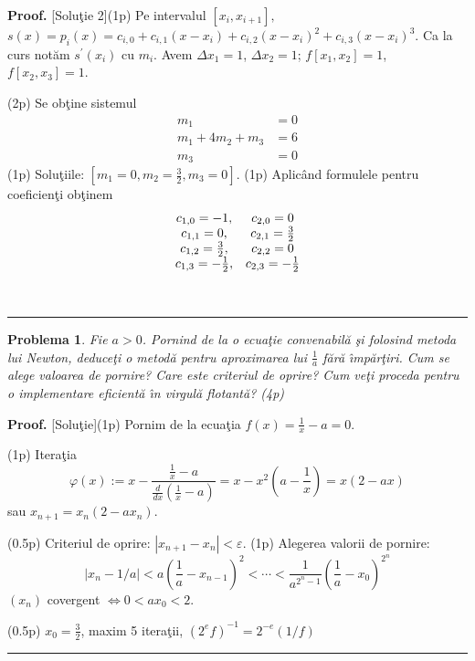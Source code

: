 \documentclass{article}%
\newtheorem{problem}[theorem]{Problema}
\newenvironment{proof}[1][Proof]{\noindent\textbf{#1.} }{\ \rule{0.5em}{0.5em}}
\begin{document}
\begin{proof}
[Solu\c{t}ie 2](1p) Pe intervalul $[x_{i},x_{i+1}],$ $s(x)=p_{i}%
(x)=c_{i,0}+c_{i,1}(x-x_{i})+c_{i,2}(x-x_{i})^{2}+c_{i,3}(x-x_{i})^{3}$. Ca la
curs not\u{a}m $s^{\prime}(x_{i})$ cu $m_{i}$. Avem $\Delta x_{1}=1$, $\Delta
x_{2}=1$; $f[x_{1},x_{2}]=1$, $f[x_{2},x_{3}]=1$. 

(2p) Se ob\c{t}ine sistemul%
\begin{align*}
m_{1}  &  =0\\
m_{1}+4m_{2}+m_{3}  &  =6\\
m_{3}  &  =0
\end{align*}
(1p) Solu\c{t}iile: $\left[  m_{1}=0,m_{2}=\frac{3}{2},m_{3}=0\right]  $. (1p)
Aplic\^{a}nd formulele pentru coeficien\c{t}i ob\c{t}inem%
\[%
\begin{array}
[c]{cc}%
c_{1,0}=-1, & c_{2,0}=0\\
c_{1,1}=0, & c_{2,1}=\frac{3}{2}\\
c_{1,2}=\frac{3}{2}, & c_{2,2}=0\\
c_{1,3}=-\frac{1}{2}, & c_{2,3}=-\frac{1}{2}%
\end{array}
\]

\end{proof}

\begin{problem}
Fie $a>0$. Pornind de la o ecua\c{t}ie convenabil\u{a} \c{s}i folosind metoda
lui Newton, deduce\c{t}i o metod\u{a} pentru aproximarea lui $\frac{1}{a}$
f\u{a}r\u{a} \^{\i}mp\u{a}r\c{t}iri. Cum se alege valoarea de pornire? Care
este criteriul de oprire? Cum ve\c{t}i proceda pentru o implementare
eficient\u{a} \^{\i}n virgul\u{a} flotant\u{a}? (4p)
\end{problem}

\begin{proof}
[Solu\c{t}ie](1p) Pornim de la ecua\c{t}ia $f(x)=\frac{1}{x}-a=0$. 

(1p) Itera\c{t}ia
\[
\varphi(x):=x-\frac{\frac{1}{x}-a}{\frac{d}{dx}\left(  \frac{1}{x}-a\right)
}=x-x^{2}\left(  a-\frac{1}{x}\right)  =x\left(  2-ax\right)
\]
sau $x_{n+1}=x_{n}\left(  2-ax_{n}\right)  $.

(0.5p) Criteriul de oprire: $|x_{n+1}-x_{n}|<\varepsilon$. (1p) Alegerea
valorii de pornire:
\[
|x_{n}-1/a|<a\left(  \frac{1}{a}-x_{n-1}\right)  ^{2}<\cdots<\frac{1}%
{a^{2^{n}-1}}\left(  \frac{1}{a}-x_{0}\right)  ^{2^{n}}%
\]
$(x_{n})$ covergent $\Longleftrightarrow0<ax_{0}<2$. 

(0.5p) $x_{0}=\frac{3}{2}%
$, maxim 5 itera\c{t}ii, $(2^{e}f)^{-1}=2^{-e}(1/f)$
\end{proof}
\end{document}
